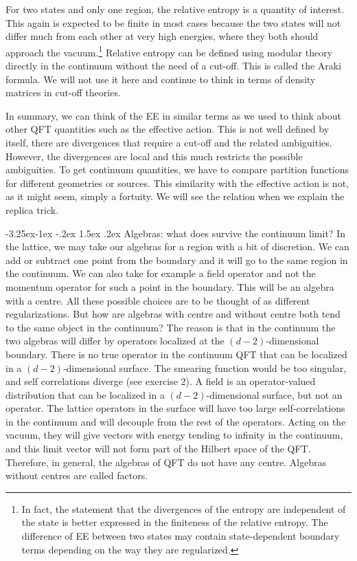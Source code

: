 \documentclass[11pt,a4paper]{article}
\makeatletter
\renewcommand\subsection{\@startsection{subsection}{2}{\z@}%
                                   {-3.25ex\@plus -1ex \@minus -.2ex}%
                                     {1.5ex \@plus .2ex}%
                                     {\normalfont\bfseries}}
\numberwithin{equation}{section}
\makeatother
\begin{document}
For two states and only one region, the relative entropy is a quantity of interest. This again is expected to be finite in most cases because the two states will not differ much from each other at very high energies, where they both should approach the vacuum.\footnote{In fact, the statement that the divergences of the entropy are independent of the state is better expressed in the finiteness of the relative entropy. The difference of EE between two states may contain state-dependent boundary terms depending on the way they are regularized.} Relative entropy can be defined using modular theory directly in the continuum without the need of a cut-off. This is called the Araki formula. We will not use it here and continue to think in terms of density matrices in cut-off theories. 

In summary, we can think of the EE in similar terms as we used to think about other QFT quantities such as the effective action. This is not well defined by itself, there are divergences that require a cut-off and the related ambiguities. However, the divergences are local and this much restricts the possible ambiguities. To get continuum quantities, we have to compare partition functions for different geometries or sources. This similarity with the effective action is not, as it might seem, simply a fortuity. We will see the relation when we explain the replica trick.  

\subsection{Algebras: what does survive the continuum limit?}
In the lattice, we may take our algebras for a region with a bit of discretion. We can add or subtract one point from the boundary and it will go to the same region in the continuum. We can also take for example a field operator and not the momentum operator for such a point in the boundary. This will be an algebra with a centre. All these possible choices are to be thought of as different regularizations. But how are algebras with centre and without centre both tend to the same object in the continuum? The reason is that in the continuum the two algebras will differ by operators localized at the $(d-2)$-dimensional boundary.  There is no true operator in the continuum QFT that can be localized in a $(d-2)$-dimensional surface. The smearing function would be too singular, and self correlations diverge (see exercise 2). A field is an operator-valued distribution that can be localized in a $(d-2)$-dimensional surface, but not an operator. The lattice operators in the surface will have too large self-correlations in the continuum and will decouple from the rest of the operators. Acting on the vacuum, they will give vectors with energy tending to infinity in the continuum, and this limit vector will not form part of the Hilbert space of the QFT. Therefore, in general, the algebras of QFT do not have any centre. Algebras without centres are called factors. 
\end{document}
